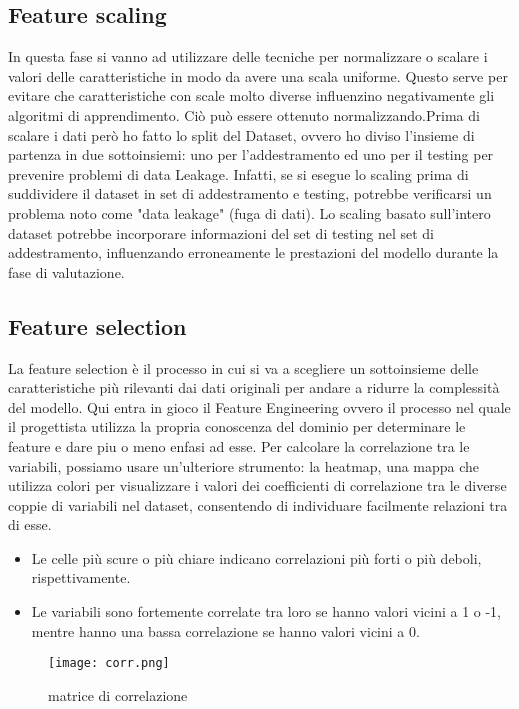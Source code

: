 \documentclass{article}
\begin{document}
\subsection{Feature scaling}
In questa fase si vanno ad utilizzare delle tecniche per normalizzare o scalare i valori delle caratteristiche in modo da avere una scala uniforme. Questo serve per evitare che caratteristiche con scale molto diverse influenzino negativamente gli algoritmi di apprendimento. Ciò può essere ottenuto normalizzando.Prima di scalare i dati però ho fatto lo split del Dataset, ovvero ho diviso l’insieme di partenza in due sottoinsiemi: uno per l’addestramento ed uno per il testing per prevenire problemi di data Leakage.
Infatti, se si esegue lo scaling prima di suddividere il dataset in set di addestramento e testing, potrebbe verificarsi un problema noto come "data leakage" (fuga di dati). Lo scaling basato sull'intero dataset potrebbe incorporare informazioni del set di testing nel set di addestramento, influenzando erroneamente le prestazioni del modello durante la fase di valutazione.

\subsection{Feature selection}
La feature selection è il processo in cui si va a scegliere un sottoinsieme delle caratteristiche più
rilevanti dai dati originali per andare a ridurre la complessità del modello. Qui entra in gioco il
Feature Engineering ovvero il processo nel quale il progettista utilizza la propria conoscenza del
dominio per determinare le feature e dare piu o meno enfasi ad esse.
\newpage
Per calcolare la correlazione tra le variabili, possiamo usare un’ulteriore strumento: la heatmap,
una mappa che utilizza colori per visualizzare i valori dei coefficienti di correlazione tra le diverse
coppie di variabili nel dataset, consentendo di individuare facilmente relazioni tra di esse.
\begin{itemize}
    \item Le celle più scure o più chiare indicano correlazioni più forti o più deboli, rispettivamente.
    \item Le variabili sono fortemente correlate tra loro se hanno valori vicini a 1 o -1, mentre hanno una bassa correlazione se hanno valori vicini a 0.
\end{itemize}
\begin{figure}
    \centering
    \texttt{[image: corr.png]}
    \caption{matrice di correlazione}
    \label{fig:enter-label}
\end{figure}
\end{document}
